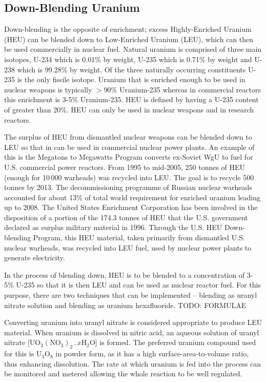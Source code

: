 \documentclass[twoside,titlepage,11pt,twocolumn,a4paper]{article}
\begin{document}
\subsection{Down-Blending Uranium}
Down-blending is the opposite of enrichment; excess Highly-Enriched
Uranium (HEU) can be blended down to Low-Enriched Uranium (LEU), which
can then be used commercially in nuclear fuel. Natural uranium is
comprised of three main isotopes, U-234 which is 0.01\% by weight,
U-235 which is 0.71\% by weight and U-238 which is 99.28\% by weight.
Of the three naturally occurring constituents U-235 is the only
fissile isotope.  Uranium that is enriched enough to be used in
nuclear weapons is typically \(>\)90\% Uranium-235 whereas in
commercial reactors this enrichment is 3-5\% Uranium-235.  HEU is
defined by having a U-235 content of greater than 20\%. HEU can only
be used in nuclear weapons and in research reactors.

The surplus of HEU from dismantled nuclear weapons can be blended down
to LEU so that in can be used in commercial nuclear power plants. An
example of this is the Megatons to Megawatts Program converts
ex-Soviet WgU to fuel for U.S. commercial power reactors. From 1995 to
mid-2005, 250 tonnes of HEU (enough for 10\,000 warheads) was recycled
into LEU. The goal is to recycle 500 tonnes by 2013. The
decommissioning programme of Russian nuclear warheads accounted for
about 13\% of total world requirement for enriched uranium leading up
to 2008. \citep{uraniumEnrichment} The United States Enrichment
Corporation has been involved in the disposition of a portion of the
174.3 tonnes of HEU that the U.S. government declared as surplus
military material in 1996. Through the U.S. HEU Down-blending Program,
this HEU material, taken primarily from dismantled U.S. nuclear
warheads, was recycled into LEU fuel, used by nuclear power plants to
generate electricity.

In the process of blending down, HEU is to be blended to a
concentration of 3-5\% U-235 so that it is then LEU and can be used as
nuclear reactor fuel. For this purpose, there are two techniques that
can be implemented -- blending as uranyl nitrate solution and blending
as uranium hexafluoride. TODO: FORMULAE

Converting uranium into uranyl nitrate is considered appropriate to
produce LEU material.  When uranium is dissolved in nitric acid, an
aqueous solution of uranyl nitrate
[\(\mathrm{UO_2(NO_3)_2\,.\,}x\mathrm{H_2O}\)] is formed. The
preferred uranium compound used for this is \(\mathrm{U_3O_8}\) in
powder form, as it has a high surface-area-to-volume ratio, thus
enhancing dissolution. The rate at which uranium is fed into the
process can be monitored and metered allowing the whole reaction to be
well regulated.
\end{document}
